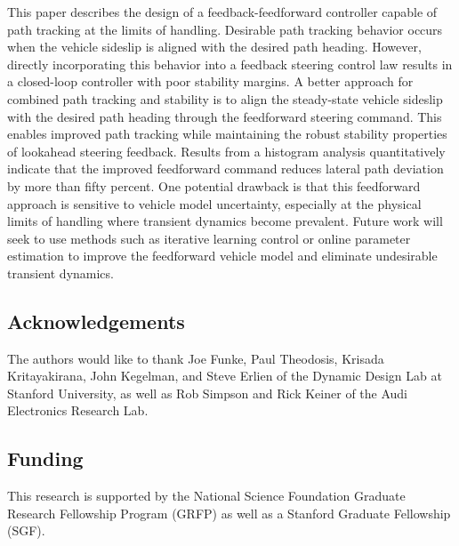 \documentclass{nVSD2e}
\theoremstyle{plain}
\theoremstyle{definition}
\theoremstyle{remark}
\begin{document}
This paper describes the design of a feedback-feedforward controller capable of path tracking at the limits of handling. Desirable
 path tracking behavior occurs when the vehicle sideslip is aligned
with the desired path heading. However, directly incorporating this behavior into a feedback steering control law results in 
a closed-loop controller with poor stability margins. 
A better approach for combined path tracking and stability is to align the steady-state vehicle sideslip 
with the desired path heading through the feedforward steering command. 
This enables improved path tracking while maintaining the robust stability properties of lookahead steering feedback. Results from a histogram
analysis quantitatively indicate that the improved feedforward command reduces lateral path deviation by more than fifty percent.
One potential drawback is that this feedforward approach is sensitive to vehicle model uncertainty, especially at the physical
limits of handling where transient dynamics become prevalent. Future work will seek to use methods such as iterative learning control
or online parameter estimation to improve the feedforward vehicle model and eliminate undesirable transient dynamics. \\

\subsection{Acknowledgements}

The authors would like to thank Joe Funke, Paul Theodosis, Krisada Kritayakirana, John Kegelman, and Steve Erlien of the Dynamic Design Lab at Stanford University, as well as Rob Simpson and Rick Keiner of the Audi Electronics Research Lab.

\subsection{Funding}

This research is supported by the National Science Foundation Graduate Research Fellowship Program (GRFP) as well as a Stanford Graduate Fellowship (SGF). 




\end{document}
